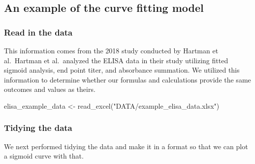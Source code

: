 \documentclass[
]{book}
\newenvironment{Shaded}{\begin{snugshade}}{\end{snugshade}}
\newcommand{\FunctionTok}[1]{\textcolor[rgb]{0.00,0.00,0.00}{#1}}
\newcommand{\NormalTok}[1]{#1}
\newcommand{\OtherTok}[1]{\textcolor[rgb]{0.56,0.35,0.01}{#1}}
\newcommand{\StringTok}[1]{\textcolor[rgb]{0.31,0.60,0.02}{#1}}
\begin{document}
\hypertarget{an-example-of-the-curve-fitting-model}{%
\subsection{An example of the curve fitting model}\label{an-example-of-the-curve-fitting-model}}

\hypertarget{read-in-the-data}{%
\subsubsection{Read in the data}\label{read-in-the-data}}

This information comes from the 2018 study conducted by Hartman et al.~Hartman et al.~analyzed the ELISA data in their study utilizing fitted sigmoid analysis, end point titer, and absorbance summation. We utilized this information to determine whether our formulas and calculations provide the same outcomes and values as theirs.

\begin{Shaded}
\begin{Highlighting}[]
\NormalTok{elisa\_example\_data }\OtherTok{\textless{}{-}} \FunctionTok{read\_excel}\NormalTok{(}\StringTok{"DATA/example\_elisa\_data.xlsx"}\NormalTok{)}
\end{Highlighting}
\end{Shaded}

\hypertarget{tidying-the-data}{%
\subsubsection{Tidying the data}\label{tidying-the-data}}

We next performed tidying the data and make it in a format so that we can plot a sigmoid curve with that.
\end{document}
